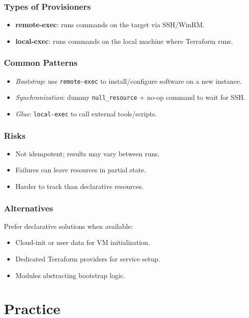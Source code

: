 \documentclass[openany, 12pt]{book}
\begin{document}
\section{Types of Provisioners}
\begin{itemize}
	\item \textbf{remote-exec}: runs commands on the target via SSH/WinRM.
	\item \textbf{local-exec}: runs commands on the local machine where Terraform runs.
\end{itemize}

\section{Common Patterns}
\begin{itemize}
	\item \emph{Bootstrap}: use \texttt{remote-exec} to install/configure software on a new instance.
	\item \emph{Synchronization}: dummy \texttt{null\_resource} + no-op command to wait for SSH.
	\item \emph{Glue}: \texttt{local-exec} to call external tools/scripts.
\end{itemize}

\section{Risks}
\begin{itemize}
	\item Not idempotent; results may vary between runs.
	\item Failures can leave resources in partial state.
	\item Harder to track than declarative resources.
\end{itemize}

\section{Alternatives}
Prefer declarative solutions when available:
\begin{itemize}
	\item Cloud-init or user data for VM initialization.
	\item Dedicated Terraform providers for service setup.
	\item Modules abstracting bootstrap logic.
\end{itemize}


\part{Practice}
\end{document}
